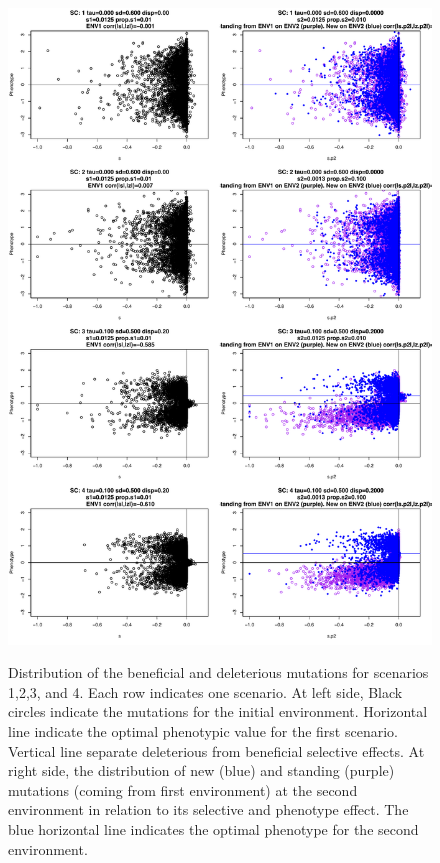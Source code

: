\documentclass[a4paper,11pt]{article}
\begin{document}
\begin{figure}[h]
{\includegraphics[scale=0.45]{./Dist_ALLScenariosv2_1.pdf}}
\caption{Distribution of the beneficial and deleterious mutations for scenarios 1,2,3, and 4. Each row indicates one scenario. At left side, Black circles indicate the mutations for the initial environment. Horizontal line indicate the optimal phenotypic value for the first scenario. Vertical line separate deleterious from beneficial selective effects. At right side, the distribution of new (blue) and standing (purple) mutations (coming from first environment) at the second environment in relation to its selective and phenotype effect. The blue horizontal line indicates the optimal phenotype for the second environment.}
\label{DistALLScenariosv21}
\hspace*{-0.5cm}
\end{figure}
\end{document}
